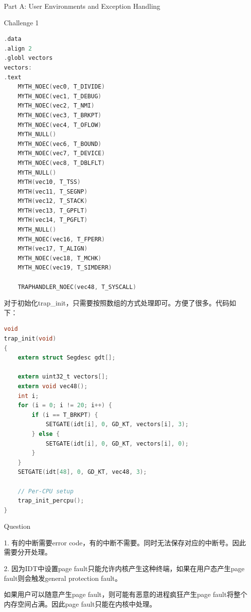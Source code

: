 \documentclass[GBK,winfonts,a4paper,10pt]{ctexart}
\begin{document}
\begin{section}{ Part A: User Environments and Exception Handling }
\begin{subsection}{ Challenge 1 }
\begin{lstlisting}[language=C]
.data
.align 2
.globl vectors
vectors:
.text
	MYTH_NOEC(vec0, T_DIVIDE)
 	MYTH_NOEC(vec1, T_DEBUG)
 	MYTH_NOEC(vec2, T_NMI)
 	MYTH_NOEC(vec3, T_BRKPT)
 	MYTH_NOEC(vec4, T_OFLOW)
 	MYTH_NULL()
 	MYTH_NOEC(vec6, T_BOUND)
	MYTH_NOEC(vec7, T_DEVICE)
 	MYTH_NOEC(vec8, T_DBLFLT)
 	MYTH_NULL()
 	MYTH(vec10, T_TSS)
 	MYTH(vec11, T_SEGNP)
 	MYTH(vec12, T_STACK)
 	MYTH(vec13, T_GPFLT)
 	MYTH(vec14, T_PGFLT) 
 	MYTH_NULL()
 	MYTH_NOEC(vec16, T_FPERR)
 	MYTH(vec17, T_ALIGN)
 	MYTH_NOEC(vec18, T_MCHK)
 	MYTH_NOEC(vec19, T_SIMDERR)
  	
    TRAPHANDLER_NOEC(vec48, T_SYSCALL)
\end{lstlisting}
\par
对于初始化trap\_init，只需要按照数组的方式处理即可。方便了很多。代码如下：
\par
\begin{lstlisting}[language=C]
void
trap_init(void)
{
	extern struct Segdesc gdt[];
    
    extern uint32_t vectors[];
    extern void vec48();
    int i;
    for (i = 0; i != 20; i++) {
    	if (i == T_BRKPT) {
    		SETGATE(idt[i], 0, GD_KT, vectors[i], 3);
    	} else {
    		SETGATE(idt[i], 0, GD_KT, vectors[i], 0);
    	}
    }
    SETGATE(idt[48], 0, GD_KT, vec48, 3);

	// Per-CPU setup 
	trap_init_percpu();
}
\end{lstlisting}
\end{subsection}

\begin{subsection}{ Question }
\par
1. 有的中断需要error code，有的中断不需要。同时无法保存对应的中断号。因此需要分开处理。
\par
2. 因为IDT中设置page fault只能允许内核产生这种终端，如果在用户态产生page fault则会触发general protection fault。
\par
如果用户可以随意产生page fault，则可能有恶意的进程疯狂产生page fault将整个内存空间占满。因此page fault只能在内核中处理。
\end{subsection}
\end{section}
\end{document}
